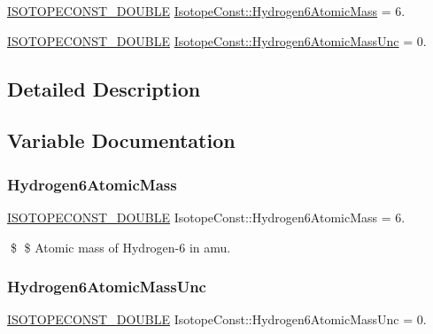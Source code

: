\begin{DoxyCompactItemize}
\item 
\mbox{\hyperlink{group___isotope_const-_macros_ga8f45a7272ce02c0b4c65c44636ed719a}{I\+S\+O\+T\+O\+P\+E\+C\+O\+N\+S\+T\+\_\+\+D\+O\+U\+B\+LE}} \mbox{\hyperlink{group___isotope_const-_hydrogen-_h6_ga653712eaee083f5c90523a73a90be1ae}{Isotope\+Const\+::\+Hydrogen6\+Atomic\+Mass}} = 6.
\item 
\mbox{\hyperlink{group___isotope_const-_macros_ga8f45a7272ce02c0b4c65c44636ed719a}{I\+S\+O\+T\+O\+P\+E\+C\+O\+N\+S\+T\+\_\+\+D\+O\+U\+B\+LE}} \mbox{\hyperlink{group___isotope_const-_hydrogen-_h6_gace4a4e7c68a60749108c72cfd4672d9e}{Isotope\+Const\+::\+Hydrogen6\+Atomic\+Mass\+Unc}} = 0.
\end{DoxyCompactItemize}


\subsection{Detailed Description}


\subsection{Variable Documentation}
\mbox{\label{group___isotope_const-_hydrogen-_h6_ga653712eaee083f5c90523a73a90be1ae}} 
\subsubsection{\texorpdfstring{Hydrogen6\+Atomic\+Mass}{Hydrogen6AtomicMass}}
{\footnotesize\ttfamily \mbox{\hyperlink{group___isotope_const-_macros_ga8f45a7272ce02c0b4c65c44636ed719a}{I\+S\+O\+T\+O\+P\+E\+C\+O\+N\+S\+T\+\_\+\+D\+O\+U\+B\+LE}} Isotope\+Const\+::\+Hydrogen6\+Atomic\+Mass = 6.}

\$ \$ Atomic mass of Hydrogen-\/6 in amu. \mbox{\label{group___isotope_const-_hydrogen-_h6_gace4a4e7c68a60749108c72cfd4672d9e}} 
\subsubsection{\texorpdfstring{Hydrogen6\+Atomic\+Mass\+Unc}{Hydrogen6AtomicMassUnc}}
{\footnotesize\ttfamily \mbox{\hyperlink{group___isotope_const-_macros_ga8f45a7272ce02c0b4c65c44636ed719a}{I\+S\+O\+T\+O\+P\+E\+C\+O\+N\+S\+T\+\_\+\+D\+O\+U\+B\+LE}} Isotope\+Const\+::\+Hydrogen6\+Atomic\+Mass\+Unc = 0.}

